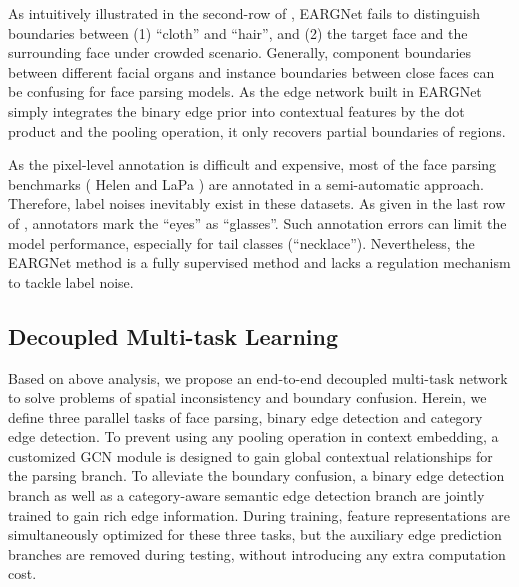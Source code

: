 \documentclass[10pt,twocolumn,letterpaper]{article}
\begin{document}
  As intuitively illustrated in the second-row of \figureautorefname{ \ref{fig:failure_case_of_fcn}}, EARGNet fails to distinguish boundaries between (1) ``cloth'' and ``hair'', and (2) the target face and the surrounding face under crowded scenario. 
Generally, component boundaries between different facial organs and instance boundaries between close faces can be confusing for face parsing models.
As the edge network built in EARGNet simply integrates the binary edge prior into contextual features by the dot product and the pooling operation, it only recovers partial boundaries of regions.

 As the pixel-level annotation is difficult and expensive, most of the face parsing benchmarks (\eg 
Helen \cite{helen} and LaPa \cite{lapa}) are annotated in a semi-automatic approach. Therefore, label noises inevitably exist in these datasets.
As given in the last row of \figureautorefname{ \ref{fig:failure_case_of_fcn}}, annotators mark the ``eyes'' as ``glasses''.
Such annotation errors can limit the model performance, especially for tail classes (\eg ``necklace''). Nevertheless, the EARGNet method is a fully supervised method and lacks a regulation mechanism to tackle label noise.

\subsection{Decoupled Multi-task Learning}

Based on above analysis, we propose an end-to-end decoupled multi-task network to solve problems of spatial inconsistency and boundary confusion. Herein, we define three parallel tasks of face parsing, binary edge detection and category edge detection. 
To prevent using any pooling operation in context embedding, a customized GCN \cite{kipf2017semi} module is designed to gain global contextual relationships for the parsing branch. To alleviate the boundary confusion, a binary edge detection branch as well as a category-aware semantic edge detection branch are jointly trained to gain rich edge information. During training, feature representations are simultaneously optimized for these three tasks, but the auxiliary edge prediction branches are removed during testing, without introducing any extra computation cost. 
\end{document}

